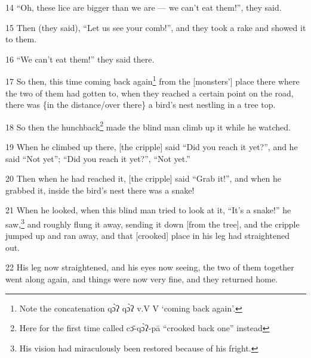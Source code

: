14 ``Oh, these lice are bigger than we are --- we can't eat them!'', they said.

15 Then (they said), ``Let us see your comb!'', and they took a rake and showed
it to them.

16 ``We can't eat them!'' they said there.

17 So then, this time coming back again\footnote{Note the concatenation qɔ̀ʔ qɔ̀ʔ v.V V `coming back again'.} from the [monsters'] place there where
the two of them had gotten to, when they reached a certain point on the road, there
was \{in the distance/over there\} a bird's nest nestling in a tree top.

18 So then the hunchback\footnote{Here for the first time called cɔ̄-qɔ̀ʔ-pā ``crooked back one'' instead} made the blind man climb up it while he watched.

19 When he climbed up there, [the cripple] said ``Did you reach it yet?'', and
he said ``Not yet''; ``Did you reach it yet?'', ``Not yet.''

20 Then when he had reached it, [the cripple] said ``Grab it!'', and when he grabbed
it, inside the bird's nest there was a snake!

21 When he looked, when this blind man tried to look at it, ``It's a snake!'' he
saw,\footnote{His vision had miraculously been restored because of his fright.} and roughly flung it away, sending it down [from the tree], and the cripple
jumped up and ran away, and that [crooked] place in his leg had straightened out.

22 His leg now straightened, and his eyes now seeing, the two of them together
went along again, and things were now very fine, and they returned home.

